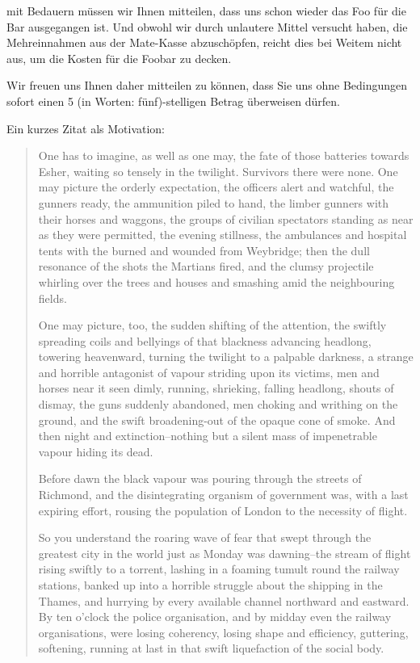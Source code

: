 \documentclass[12pt,ngerman,latin9,a4paper]{g-brief-ntz39}
\begin{document}
\begin{g-brief}

mit Bedauern m\"ussen wir Ihnen mitteilen, dass uns schon wieder das Foo f\"ur die Bar ausgegangen ist. Und obwohl wir durch unlautere Mittel versucht haben, die Mehreinnahmen aus der Mate-Kasse abzusch\"opfen, reicht dies bei Weitem nicht aus, um die Kosten f\"ur die Foobar zu decken.

Wir freuen uns Ihnen daher mitteilen zu k\"onnen, dass Sie uns ohne Bedingungen sofort einen 5 (in Worten: f\"unf)-stelligen Betrag \"uberweisen d\"urfen.

Ein kurzes Zitat als Motivation:

\begin{quote}
One has to imagine, as well as one may, the fate of those batteries towards Esher, waiting so tensely in the twilight.  Survivors there were none.  One may picture the orderly expectation, the officers alert and watchful, the gunners ready, the ammunition piled to hand, the limber gunners with their horses and waggons, the groups of civilian spectators standing as near as they were permitted, the evening stillness, the ambulances and hospital tents with the burned and wounded from Weybridge; then the dull resonance of the shots the Martians fired, and the clumsy projectile whirling over the trees and houses and smashing amid the neighbouring fields.

One may picture, too, the sudden shifting of the attention, the swiftly spreading coils and bellyings of that blackness advancing headlong, towering heavenward, turning the twilight to a palpable darkness, a strange and horrible antagonist of vapour striding upon its victims, men and horses near it seen dimly, running, shrieking, falling headlong, shouts of dismay, the guns suddenly abandoned, men choking and writhing on the ground, and the swift broadening-out of the opaque cone of smoke.  And then night and extinction--nothing but a silent mass of impenetrable vapour hiding its dead.

Before dawn the black vapour was pouring through the streets of Richmond, and the disintegrating organism of government was, with a last expiring effort, rousing the population of London to the necessity of flight.

So you understand the roaring wave of fear that swept through the greatest city in the world just as Monday was dawning--the stream of flight rising swiftly to a torrent, lashing in a foaming tumult round the railway stations, banked up into a horrible struggle about the shipping in the Thames, and hurrying by every available channel northward and eastward.  By ten o'clock the police organisation, and by midday even the railway organisations, were losing coherency, losing shape and efficiency, guttering, softening, running at last in that swift liquefaction of the social body.


\end{quote}
\end{g-brief}
\end{document}
